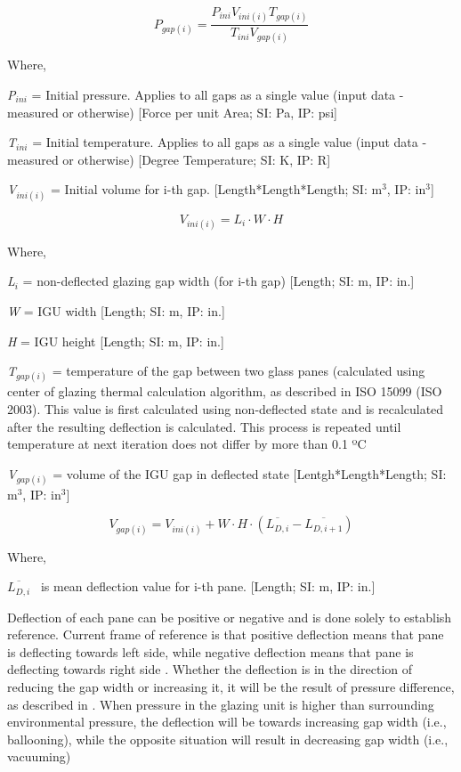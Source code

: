 \begin{equation}
{P_{gap\left( i \right)}} = \frac{{{P_{ini}}{V_{ini\left( i \right)}}{T_{gap\left( i \right)}}}}{{{T_{ini}}{V_{gap\left( i \right)}}}}
\end{equation}

Where,

\emph{P\(_{ini}\)} = Initial pressure. Applies to all gaps as a single value (input data - measured or otherwise) {[}Force per unit Area; SI: Pa, IP: psi{]}

\emph{T\(_{ini}\)} = Initial temperature. Applies to all gaps as a single value (input data - measured or otherwise) {[}Degree Temperature; SI: K, IP: R{]}

\emph{V\(_{ini(i)}\)} = Initial volume for i-th gap. {[}Length*Length*Length; SI: m\(^{3}\), IP: in\(^{3}\){]}

\begin{equation}
{V_{ini\left( i \right)}} = {L_i}\cdot W\cdot H
\end{equation}

Where,

\emph{L\(_{i}\)} = non-deflected glazing gap width (for i-th gap) {[}Length; SI: m, IP: in.{]}

\emph{W} = IGU width {[}Length; SI: m, IP: in.{]}

\emph{H} = IGU height {[}Length; SI: m, IP: in.{]}

\emph{T\(_{gap(i)}\)} = temperature of the gap between two glass panes (calculated using center of glazing thermal calculation algorithm, as described in ISO 15099 (ISO 2003). This value is first calculated using non-deflected state and is recalculated after the resulting deflection is calculated. This process is repeated until temperature at next iteration does not differ by more than 0.1 ºC

\emph{V\(_{gap(i)}\)} = volume of the IGU gap in deflected state {[}Lentgh*Length*Length; SI: m\(^{3}\), IP: in\(^{3}\){]}

\begin{equation}
{V_{gap\left( i \right)}} = {V_{ini\left( i \right)}} + W\cdot H\cdot \left( {\overline {{L_{D,i}}}  - \overline {{L_{D,i + 1}}} } \right)
\end{equation}

Where,

\(\overline {{L_{D,i}}}\) ~is mean deflection value for i-th pane. {[}Length; SI: m, IP: in.{]}

Deflection of each pane can be positive or negative and is done solely to establish reference. Current frame of reference is that positive deflection means that pane is deflecting towards left side, while negative deflection means that pane is deflecting towards right side . Whether the deflection is in the direction of reducing the gap width or increasing it, it will be the result of pressure difference, as described in . When pressure in the glazing unit is higher than surrounding environmental pressure, the deflection will be towards increasing gap width (i.e., ballooning), while the opposite situation will result in decreasing gap width (i.e., vacuuming)

